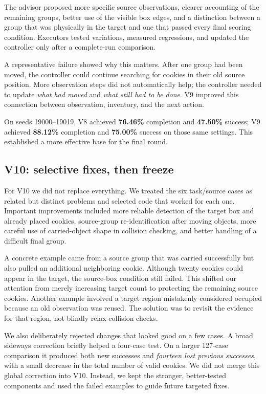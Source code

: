 The advisor proposed more specific source observations, clearer accounting of the remaining groups, better use of the visible box edges, and a distinction between a group that was physically in the target and one that passed every final scoring condition. Executors tested variations, measured regressions, and updated the controller only after a complete-run comparison.

A representative failure showed why this matters. After one group had been moved, the controller could continue searching for cookies in their old source position. More observation steps did not automatically help; the controller needed to update \emph{what had moved} and \emph{what still had to be done}. V9 improved this connection between observation, inventory, and the next action.

On seeds 19000--19019, V8 achieved \textbf{76.46\%} completion and \textbf{47.50\%} success; V9 achieved \textbf{88.12\%} completion and \textbf{75.00\%} success on those same settings. This established a more effective base for the final round.

\subsection{V10: selective fixes, then freeze}
For V10 we did not replace everything. We treated the six task/source cases as related but distinct problems and selected code that worked for each one. Important improvements included more reliable detection of the target box and already placed cookies, source-group re-identification after moving objects, more careful use of carried-object shape in collision checking, and better handling of a difficult final group.

A concrete example came from a source group that was carried successfully but also pulled an additional neighboring cookie. Although twenty cookies could appear in the target, the source-box condition still failed. This shifted our attention from merely increasing target count to protecting the remaining source cookies. Another example involved a target region mistakenly considered occupied because an old observation was reused. The solution was to revisit the evidence for that region, not blindly relax collision checks.

We also deliberately rejected changes that looked good on a few cases. A broad sideways correction briefly helped a four-case test. On a larger 127-case comparison it produced both new successes and \emph{fourteen lost previous successes}, with a small decrease in the total number of valid cookies. We did not merge this global correction into V10. Instead, we kept the stronger, better-tested components and used the failed examples to guide future targeted fixes.

